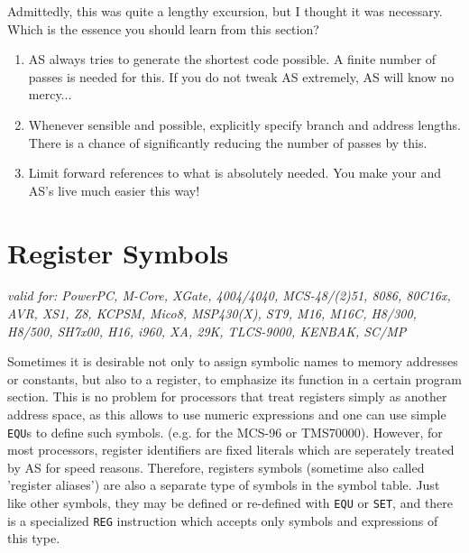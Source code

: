 \documentclass[12pt,twoside]{report}
\makeatletter
\newcommand{\tty}[1]{{\tt #1}}
\newcommand{\ttindex}[1]{\index{#1@{\tt #1}}}
\newcommand{\asname}{{AS}}
\makeatother
\begin{document}
Admittedly, this was quite a lengthy excursion, but I thought it was
necessary.  Which is the essence you should learn from this section?
\begin{enumerate}
\item{\asname{} always tries to generate the shortest code possible.  A
      finite number of passes is needed for this.  If you do not tweak
      \asname{} extremely, \asname{} will know no mercy...}
\item{Whenever sensible and possible, explicitly specify branch and
      address lengths.  There is a chance of significantly reducing the
      number of passes by this.}
\item{Limit forward references to what is absolutely needed.  You make
      your and \asname{}'s live much easier this way!}
\end{enumerate}


\section{Register Symbols}
\label{SectRegSyms} \ttindex{Register Symbols}

{\em valid for: PowerPC, M-Core, XGate, 4004/4040, MCS-48/(2)51, 8086,
     80C16x, AVR, XS1, Z8, KCPSM, Mico8, MSP430(X), ST9, M16, M16C, H8/300,
     H8/500, SH7x00, H16, i960, XA, 29K, TLCS-9000, KENBAK, SC/MP}

Sometimes it is desirable not only to assign symbolic names to memory
addresses or constants, but also to a register, to emphasize its function
in a certain program section.  This is no problem for processors that
treat registers simply as another address space, as this allows to use
numeric expressions and one can use simple \tty{EQU}s to define such
symbols.  (e.g. for the MCS-96 or TMS70000).  However, for most
processors, register identifiers are fixed literals which are seperately
treated by \asname{} for speed reasons.  Therefore, registers symbols (sometime
also called 'register aliases') are also a separate type of symbols in
the symbol table.  Just like other symbols, they may be defined or re-defined
with \tty{EQU} or \tty{SET}, and there is a specialized \tty{REG} instruction
which accepts only symbols and expressions of this type.
\end{document}
